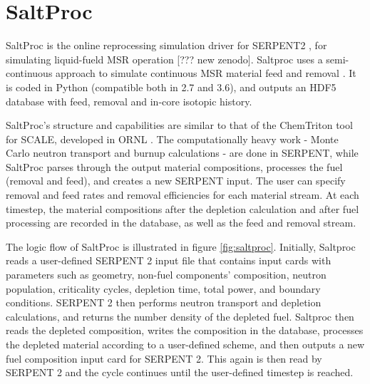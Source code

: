 \section{SaltProc}

SaltProc is the online reprocessing simulation
driver for SERPENT2 \cite{leppanen_serpent-a_2013},
for simulating liquid-fueld \gls{MSR} operation [??? new zenodo].
Saltproc uses a semi-continuous approach to simulate
continuous \gls{MSR} material feed and removal \cite{rykhlevskii_online_2017}.
It is coded in Python (compatible both in 2.7 and 3.6), and
outputs an HDF5 \cite{the_hierarchical_1997} database
with feed, removal and in-core isotopic history.

SaltProc's structure and capabilities are similar to that of the
ChemTriton tool for SCALE, developed in ORNL \cite{betzler_molten_2017}.
The computationally heavy work - Monte Carlo neutron transport and
burnup calculations - are done in SERPENT, while SaltProc parses through
the output material compositions, processes the fuel (removal and feed),
and creates a new SERPENT input. The user can specify removal and feed
rates and removal efficiencies for each material stream. At each
timestep, the material compositions after the
depletion calculation and after fuel processing are recorded in the
database, as well as the feed and removal stream. 

The logic flow of SaltProc is illustrated in figure \ref{fig:saltproc}.
Initially, Saltproc reads a user-defined SERPENT 2 input file that
contains input cards with parameters such as  geometry, non-fuel components' composition,
neutron population, criticality cycles, depletion time, total power, and boundary conditions.
SERPENT 2 then performs neutron transport and depletion calculations, and 
returns the number density of the depleted fuel. Saltproc then reads the
depleted composition, writes the composition in the database, processes
the depleted material according to a user-defined scheme, and then
outputs a new fuel composition input card for SERPENT 2. This again
is then read by SERPENT 2 and the cycle continues until the user-defined
timestep is reached.

